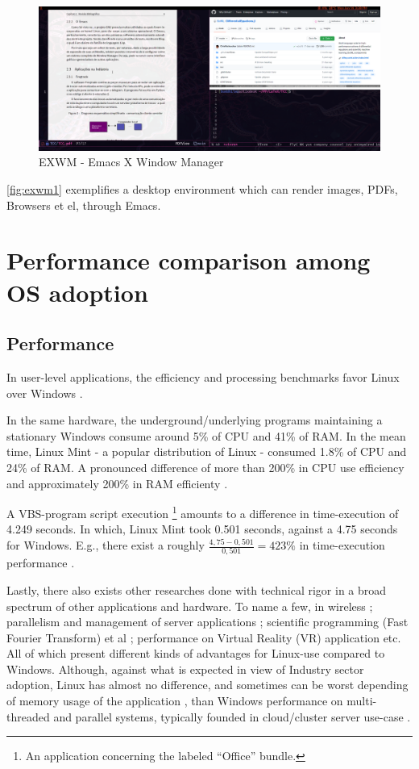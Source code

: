 \documentclass[
12pt,				%
openright,			%
oneside,			%
a4paper,			%
brazil,				%
english,			%
]{abntex2}
\begin{document}
\begin{figure}[ht]
  \centering
  \caption{\label{fig:exwm1} EXWM - Emacs X Window Manager}
  \includegraphics[width=\linewidth]{exwm2.png}
\end{figure}

\autoref{fig:exwm1} exemplifies a desktop environment which can render
images, PDFs, Browsers et el, through Emacs. 

\section{Performance comparison among OS adoption}

\subsection{Performance}
In user-level applications, the efficiency and processing benchmarks
favor Linux over Windows \cite{sulaiman2021comparison}.

In the same hardware, the underground/underlying programs maintaining
a stationary Windows consume around 5\% of CPU and 41\% of RAM. In the
mean time, Linux Mint - a popular distribution of Linux - consumed
1.8\% of CPU and 24\% of RAM. A pronounced difference of more than
200\% in CPU use efficiency and approximately 200\% in RAM efficienty \cite{sulaiman2021comparison}. 

A VBS-program script execution \footnote{An application concerning the
  labeled ``Office'' bundle.} amounts to a difference in
time-execution of 4.249 seconds. In which, Linux
Mint took 0.501 seconds, against a 4.75 seconds for Windows. E.g.,
there exist a roughly $\frac{4,75-0,501}{0,501}= 423\%$ in
time-execution performance \cite{sulaiman2021comparison}.

Lastly, there also exists other researches done with technical rigor in a
broad spectrum of other applications and hardware. To name a few, in
wireless \cite{SDevan2013WINDOWS8V}; parallelism and management of
server applications \cite{aveleda2010performance}; scientific programming (Fast Fourier Transform) et al
\cite{d2011performance}; performance on Virtual Reality (VR)
application \cite{thubaasini2010efficient} etc. All of which present
different kinds of advantages for Linux-use compared to
Windows. Although, against what is expected in view of Industry sector
adoption, Linux has almost no difference, and sometimes can be worst
depending of memory usage of the application \cite{ristov2013}, than Windows performance on
multi-threaded and parallel systems, typically founded in cloud/cluster
server use-case \cite{aveleda2010performance}.
\end{document}
